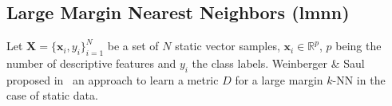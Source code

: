 %


\subsection{Large Margin Nearest Neighbors ({\sc lmnn})}
\label{LMNN}
Let $\textbf{X}=\{\textbf{x}_i,y_i\}_{i=1}^N$ be a set of $N$ static vector samples, ${\textbf{x}_i \in \mathbb{R}^{p}}$, $p$ being the number of descriptive features and $y_i$ the class labels. Weinberger \& Saul proposed in~\cite{Weinberger2009} an approach to learn a metric $D$ for a large margin $k$-NN in the case of static data. 

